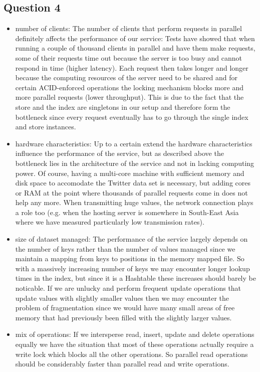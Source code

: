 \documentclass[12pt,a4paper]{article}
\begin{document}
\subsection*{Question 4}
\label{sec:pq4}
\begin{itemize}
  \item number of clients: The number of clients that perform requests in parallel definitely affects the performance of our service: Tests have showed that when running a couple of thousand clients in parallel and have them make requests, some of their requests time out because the server is too busy and cannot respond in time (higher latency). Each request then takes longer and longer because the computing resources of the server need to be shared and for certain ACID-enforced operations the locking mechanism blocks more and more parallel requests (lower throughput). This is due to the fact that the store and the index are singletons in our setup and therefore form the bottleneck since every request eventually has to go through the single index and store instances.
  \item hardware characteristics: Up to a certain extend the hardware characteristics influence the performance of the service, but as described above the bottleneck lies in the architecture of the service and not in lacking computing power. Of course, having a multi-core machine with sufficient memory and disk space to accomodate the Twitter data set is necessary, but adding cores or RAM at the point where thousands of parallel requests come in does not help any more. When transmitting huge values, the network connection plays a role too (e.g. when the hosting server is somewhere in South-East Asia where we have measured particularly low transmission rates).
  \item size of dataset managed: The performance of the service largely depends on the number of keys rather than the number of values managed since we maintain a mapping from keys to positions in the memory mapped file. So with a massively increasing number of keys we may encounter longer lookup times in the index, but since it is a Hashtable these increases should barely be noticable. If we are unlucky and perform frequent update operations that update values with slightly smaller values then we may encounter the problem of fragmentation since we would have many small areas of free memory that had previously been filled with the slightly larger values.
  \item mix of operations: If we intersperse read, insert, update and delete operations equally we have the situation that most of these operations actually require a write lock which blocks all the other operations. So parallel read operations should be considerably faster than parallel read and write operations.

\end{itemize}
\end{document}
